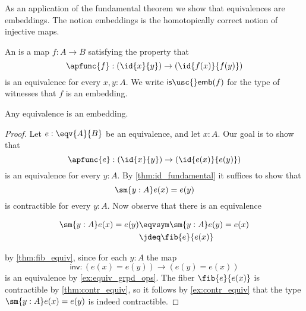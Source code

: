 As an application of the fundamental theorem we show that equivalences are embeddings. The notion embeddings is the homotopically correct notion of injective maps.

\begin{defn}
An  is a map $f:A\to B$ satisfying the property that
\begin{equation*}
\apfunc{f}:(\id{x}{y})\to(\id{f(x)}{f(y)})
\end{equation*}
is an equivalence for every $x,y:A$. We write $\mathsf{is\usc{}emb}(f)$ for the type of witnesses that $f$ is an embedding.
\end{defn}

\begin{thm}
\label{cor:emb_equiv} 
Any equivalence is an embedding.
\end{thm}

\begin{proof}
Let $e:\eqv{A}{B}$ be an equivalence, and let $x:A$. Our goal is to show that
\begin{equation*}
\apfunc{e} : (\id{x}{y})\to (\id{e(x)}{e(y)})
\end{equation*}
is an equivalence for every $y:A$. By \autoref{thm:id_fundamental} it suffices to show that 
\begin{equation*}
\sm{y:A}e(x)=e(y)
\end{equation*}
is contractible for every $y:A$. Now observe that there is an equivalence
\begin{samepage}
\begin{align*}
\sm{y:A}e(x)=e(y) & \eqvsym \sm{y:A}e(y)=e(x) \\
& \jdeq \fib{e}{e(x)}
\end{align*}
\end{samepage}
by \cref{thm:fib_equiv}, since for each $y:A$ the map
\begin{equation*}
\mathsf{inv} : (e(x)=e(y))\to (e(y)= e(x))
\end{equation*}
is an equivalence by \cref{ex:equiv_grpd_ops}.
The fiber $\fib{e}{e(x)}$ is contractible by \cref{thm:contr_equiv}, so it follows by \autoref{ex:contr_equiv} that the type $\sm{y:A}e(x)=e(y)$ is indeed contractible.
\end{proof}

